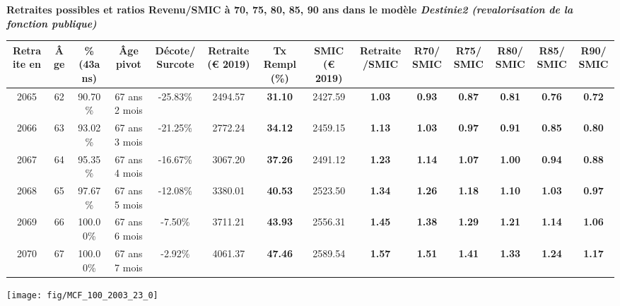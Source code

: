  \vspace{0.1cm} 
{\bf \noindent Retraites possibles et ratios Revenu/SMIC à 70, 75, 80, 85, 90 ans dans le modèle \emph{Destinie2 (revalorisation de la fonction publique)}}  
 
\begin{adjustbox}{max width=\textwidth} 
\begin{tabular}[htb]{|c|c||c|c|c||c|c||c|c||c|c|c|c|c|} 
\hline 
 Retraite en &  Âge &  \%(43ans) &  Âge pivot &  Décote/Surcote &  Retraite (\euro{} 2019) &  Tx Rempl(\%) &  SMIC (\euro{} 2019) &  Retraite/SMIC &  R70/SMIC &  R75/SMIC &  R80/SMIC &  R85/SMIC &  R90/SMIC \\ 
\hline \hline 
 2065 &  62 &  90.70\% &  67 ans 2 mois &  -25.83\% &  2494.57 &  {\bf 31.10} &  2427.59 &  {\bf 1.03} &  {\bf {\color{red} 0.93}} &  {\bf {\color{red} 0.87}} &  {\bf {\color{red} 0.81}} &  {\bf {\color{red} 0.76}} &  {\bf {\color{red} 0.72}} \\ 
\hline 
 2066 &  63 &  93.02\% &  67 ans 3 mois &  -21.25\% &  2772.24 &  {\bf 34.12} &  2459.15 &  {\bf 1.13} &  {\bf 1.03} &  {\bf {\color{red} 0.97}} &  {\bf {\color{red} 0.91}} &  {\bf {\color{red} 0.85}} &  {\bf {\color{red} 0.80}} \\ 
\hline 
 2067 &  64 &  95.35\% &  67 ans 4 mois &  -16.67\% &  3067.20 &  {\bf 37.26} &  2491.12 &  {\bf 1.23} &  {\bf 1.14} &  {\bf 1.07} &  {\bf 1.00} &  {\bf {\color{red} 0.94}} &  {\bf {\color{red} 0.88}} \\ 
\hline 
 2068 &  65 &  97.67\% &  67 ans 5 mois &  -12.08\% &  3380.01 &  {\bf 40.53} &  2523.50 &  {\bf 1.34} &  {\bf 1.26} &  {\bf 1.18} &  {\bf 1.10} &  {\bf 1.03} &  {\bf {\color{red} 0.97}} \\ 
\hline 
 2069 &  66 &  100.00\% &  67 ans 6 mois &  -7.50\% &  3711.21 &  {\bf 43.93} &  2556.31 &  {\bf 1.45} &  {\bf 1.38} &  {\bf 1.29} &  {\bf 1.21} &  {\bf 1.14} &  {\bf 1.06} \\ 
\hline 
 2070 &  67 &  100.00\% &  67 ans 7 mois &  -2.92\% &  4061.37 &  {\bf 47.46} &  2589.54 &  {\bf 1.57} &  {\bf 1.51} &  {\bf 1.41} &  {\bf 1.33} &  {\bf 1.24} &  {\bf 1.17} \\ 
\hline 
\hline 
\end{tabular} 
\end{adjustbox} 
 
 \vspace{0.1cm} 

 {\hspace{-2.2cm}\texttt{[image: fig/MCF\_100\_2003\_23\_0]}} 

